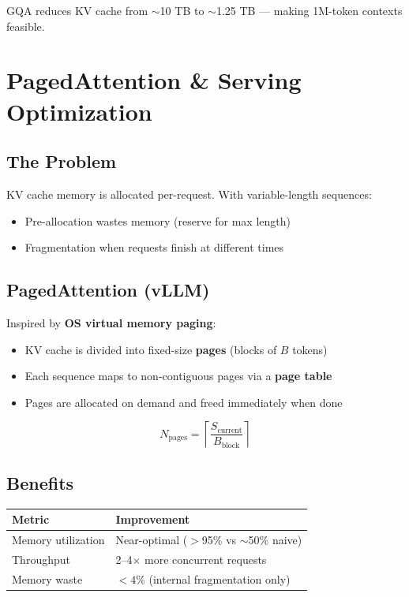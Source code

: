 \documentclass[11pt,a4paper]{article}
\begin{document}
GQA reduces KV cache from $\sim$10 TB to $\sim$1.25 TB --- making 1M-token contexts feasible.

\section{PagedAttention \& Serving Optimization}

\subsection{The Problem}

KV cache memory is allocated per-request. With variable-length sequences:
\begin{itemize}[itemsep=1pt]
  \item Pre-allocation wastes memory (reserve for max length)
  \item Fragmentation when requests finish at different times
\end{itemize}

\subsection{PagedAttention (vLLM)}

Inspired by \textbf{OS virtual memory paging}:

\begin{itemize}[itemsep=1pt]
  \item KV cache is divided into fixed-size \textbf{pages} (blocks of $B$ tokens)
  \item Each sequence maps to non-contiguous pages via a \textbf{page table}
  \item Pages are allocated on demand and freed immediately when done
\end{itemize}

$$N_{\text{pages}} = \left\lceil \frac{S_{\text{current}}}{B_{\text{block}}} \right\rceil$$

\subsection{Benefits}

\begin{center}
\begin{tabular}{ll}
\toprule
\textbf{Metric} & \textbf{Improvement} \\
\midrule
Memory utilization & Near-optimal ($>$95\% vs $\sim$50\% naive) \\
Throughput & 2--4$\times$ more concurrent requests \\
Memory waste & $< 4\%$ (internal fragmentation only) \\
\bottomrule
\end{tabular}
\end{center}
\end{document}
